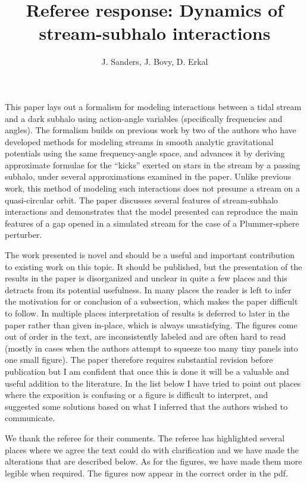 \documentclass{article}
\title{Referee response: Dynamics of stream-subhalo interactions}
\author{J. Sanders, J. Bovy, D. Erkal}
\begin{document}
\maketitle


This paper lays out a formalism for modeling interactions between a tidal stream and a
dark subhalo using action-angle variables (specifically frequencies and angles). The
formalism builds on previous work by two of the authors who have developed methods
for modeling streams in smooth analytic gravitational potentials using the same
frequency-angle space, and advances it by deriving approximate formulae for the
“kicks” exerted on stars in the stream by a passing subhalo, under several
approximations examined in the paper. Unlike previous work, this method of modeling
such interactions does not presume a stream on a quasi-circular orbit. The paper
discusses several features of stream-subhalo interactions and demonstrates that the
model presented can reproduce the main features of a gap opened in a simulated
stream for the case of a Plummer-sphere perturber.


The work presented is novel and should be a useful and important contribution to
existing work on this topic. It should be published, but the presentation of the results in
the paper is disorganized and unclear in quite a few places and this detracts from its
potential usefulness. In many places the reader is left to infer the motivation for or
conclusion of a subsection, which makes the paper difficult to follow. In multiple places
interpretation of results is deferred to later in the paper rather than given in-place, which
is always unsatisfying. The figures come out of order in the text, are inconsistently
labeled and are often hard to read (mostly in cases when the authors attempt to
squeeze too many tiny panels into one small figure). The paper therefore requires
substantial revision before publication but I am confident that once this is done it will be
a valuable and useful addition to the literature.
In the list below I have tried to point out places where the exposition is confusing or a
figure is difficult to interpret, and suggested some solutions based on what I inferred that
the authors wished to communicate.


{\color{red} We thank the referee for their comments. The referee has highlighted several places where we agree the text could do with clarification and we have made the alterations that are described below. As for the figures, we have made them more legible when required. The figures now appear in the correct order in the pdf.}
\end{document}
